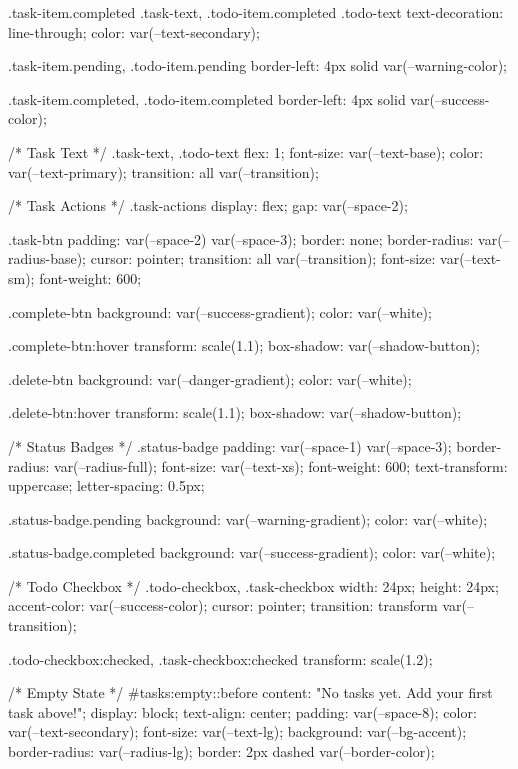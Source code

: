.task-item.completed .task-text,
.todo-item.completed .todo-text {
  text-decoration: line-through;
  color: var(--text-secondary);
}

.task-item.pending, .todo-item.pending {
  border-left: 4px solid var(--warning-color);
}

.task-item.completed, .todo-item.completed {
  border-left: 4px solid var(--success-color);
}

/* Task Text */
.task-text, .todo-text {
  flex: 1;
  font-size: var(--text-base);
  color: var(--text-primary);
  transition: all var(--transition);
}

/* Task Actions */
.task-actions {
  display: flex;
  gap: var(--space-2);
}

.task-btn {
  padding: var(--space-2) var(--space-3);
  border: none;
  border-radius: var(--radius-base);
  cursor: pointer;
  transition: all var(--transition);
  font-size: var(--text-sm);
  font-weight: 600;
}

.complete-btn {
  background: var(--success-gradient);
  color: var(--white);
}

.complete-btn:hover {
  transform: scale(1.1);
  box-shadow: var(--shadow-button);
}

.delete-btn {
  background: var(--danger-gradient);
  color: var(--white);
}

.delete-btn:hover {
  transform: scale(1.1);
  box-shadow: var(--shadow-button);
}

/* Status Badges */
.status-badge {
  padding: var(--space-1) var(--space-3);
  border-radius: var(--radius-full);
  font-size: var(--text-xs);
  font-weight: 600;
  text-transform: uppercase;
  letter-spacing: 0.5px;
}

.status-badge.pending {
  background: var(--warning-gradient);
  color: var(--white);
}

.status-badge.completed {
  background: var(--success-gradient);
  color: var(--white);
}

/* Todo Checkbox */
.todo-checkbox, .task-checkbox {
  width: 24px;
  height: 24px;
  accent-color: var(--success-color);
  cursor: pointer;
  transition: transform var(--transition);
}

.todo-checkbox:checked, .task-checkbox:checked {
  transform: scale(1.2);
}

/* Empty State */
#tasks:empty::before {
  content: "No tasks yet. Add your first task above!";
  display: block;
  text-align: center;
  padding: var(--space-8);
  color: var(--text-secondary);
  font-size: var(--text-lg);
  background: var(--bg-accent);
  border-radius: var(--radius-lg);
  border: 2px dashed var(--border-color);
}

